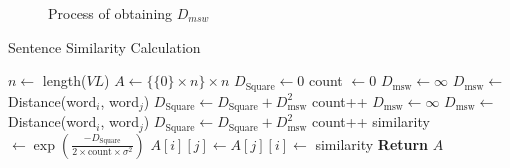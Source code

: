 \begin{figure}
    \centering
    
    \caption{Process of obtaining $D_{msw}$}
    \label{fig:msd}
\end{figure}
\begin{algorithm} \caption{Sentence Similarity Calculation} \label{alg:similarity}
\begin{algorithmic}[1]
    \State $n \gets$ length($VL$)
    \State $A \gets \{ \{0\} \times n \} \times n$
        \State $D_{\text{Square}} \gets 0$
        \State count $\gets 0$
                \State $D_{\text{msw}} \gets \infty$
                        \State $D_{\text{msw}} \gets$ Distance(word$_i$, word$_j$)
                    \EndIf
                \EndFor
                \State $D_{\text{Square}} \gets D_{\text{Square}} + D_{\text{msw}}^2$
                \State count++
            \EndFor
                \State $D_{\text{msw}} \gets \infty$
                        \State $D_{\text{msw}} \gets$ Distance(word$_i$, word$_j$)
                    \EndIf
                \EndFor
                \State $D_{\text{Square}} \gets D_{\text{Square}} + D_{\text{msw}}^2$
                \State count++
            \EndFor
            \State similarity $\gets \exp \left( \frac{- D_{\text{Square}}}{2 \times \text{count} \times \sigma^2} \right)$
            \State $A[i][j] \gets A[j][i] \gets$ similarity
        \EndFor
    \EndFor
    \State \textbf{Return} $A$
\end{algorithmic}
\end{algorithm}
